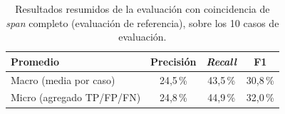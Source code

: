 \begin{table}[htbp]
    \centering
    \caption{Resultados resumidos de la evaluación  con coincidencia de \textit{span}
    completo (evaluación de referencia), sobre los 10 casos de evaluación.}
    \label{tab:ner_resumen_estricta}
    \begin{tabular}{@{}lccc@{}}
    \toprule
    \textbf{Promedio} & \textbf{Precisión} & \textbf{\textit{Recall}} & \textbf{F1} \\
    \midrule
    Macro (media por caso) & 24,5\,\% & 43,5\,\% & 30,8\,\% \\
    Micro (agregado TP/FP/FN) & 24,8\,\% & 44,9\,\% & 32,0\,\% \\
    \bottomrule
    \end{tabular}
\end{table}
